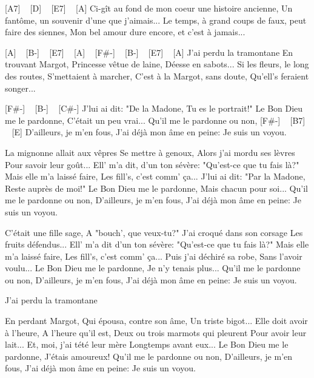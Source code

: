 [A7] ~ [D] ~ [E7] ~ [A]
Ci-gît au fond de mon coeur une histoire ancienne,
Un fantôme, un souvenir d'une que j'aimais...
Le temps, à grand coups de faux, peut faire des siennes,
Mon bel amour dure encore, et c'est à jamais...

[A] ~ [B-] ~ [E7] ~ [A] ~ [F#-] ~ [B-] ~ [E7] ~ [A]
J'ai perdu la tramontane
En trouvant Margot,
Princesse vêtue de laine,
Déesse en sabots...
Si les fleurs, le long des routes,
S'mettaient à marcher,
C'est à la Margot, sans doute,
Qu'ell's feraient songer...

[F#-] ~ [B-] ~ [C#-]
J'lui ai dit: "De la Madone,
Tu es le portrait!"
Le Bon Dieu me le pardonne,
C'était un peu vrai...
Qu'il me le pardonne ou non,
[F#-] ~ [B7] ~ [E]
D'ailleurs, je m'en fous,
J'ai déjà mon âme en peine:
Je suis un voyou.


La mignonne allait aux vêpres
Se mettre à genoux,
Alors j'ai mordu ses lèvres
Pour savoir leur goût...
Ell' m'a dit, d'un ton sévère:
"Qu'est-ce que tu fais là?"
Mais elle m'a laissé faire,
Les fill's, c'est comm' ça...
J'lui ai dit: "Par la Madone,
Reste auprès de moi!"
Le Bon Dieu me le pardonne,
Mais chacun pour soi...
Qu'il me le pardonne ou non,
D'ailleurs, je m'en fous,
J'ai déjà mon âme en peine:
Je suis un voyou.


C'était une fille sage,
A "bouch', que veux-tu?"
J'ai croqué dans son corsage
Les fruits défendus...
Ell' m'a dit d'un ton sévère:
"Qu'est-ce que tu fais là?"
Mais elle m'a laissé faire,
Les fill's, c'est comm' ça...
Puis j'ai déchiré sa robe,
Sans l'avoir voulu...
Le Bon Dieu me le pardonne,
Je n'y tenais plus...
Qu'il me le pardonne ou non,
D'ailleurs, je m'en fous,
J'ai déjà mon âme en peine:
Je suis un voyou.

J'ai perdu la tramontane

En perdant Margot,
Qui épousa, contre son âme,
Un triste bigot...
Elle doit avoir à l'heure,
A l'heure qu'il est,
Deux ou trois marmots qui pleurent
Pour avoir leur lait...
Et, moi, j'ai tété leur mère
Longtemps avant eux...
Le Bon Dieu me le pardonne,
J'étais amoureux!
Qu'il me le pardonne ou non,
D'ailleurs, je m'en fous,
J'ai déjà mon âme en peine:
Je suis un voyou.

